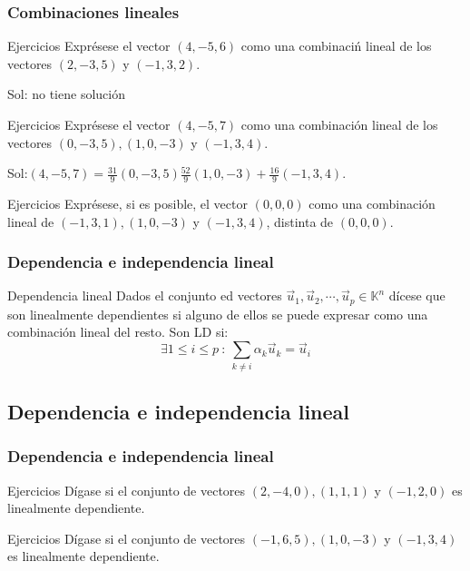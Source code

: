 \documentclass{beamer}
\begin{document}
\begin{frame}
  \frametitle{Combinaciones lineales}
  \begin{block}{Ejercicios}
Expr\'esese el vector $(4,-5,6)$ como una combinaci\'n lineal de los vectores $(2,-3,5)$ y $(-1,3,2)$.
\end{block}
Sol: no tiene soluci\'on
\begin{block}{Ejercicios}
Expr\'esese el vector $(4,-5,7)$ como una combinaci\'on lineal de los vectores $(0,-3,5),(1,0,-3)$ y $(-1,3,4)$.
\end{block}
Sol:$(4,-5,7) = \frac{31}{9}(0,-3,5)\frac{52}{9}(1,0,-3)+\frac{16}{9}(-1,3,4)$.
\begin{block}{Ejercicios}
Expr\'esese, si es posible, el vector $(0,0,0)$ como una combinaci\'on lineal de $(-1,3,1), (1,0,-3)$ y $(-1,3,4)$, distinta de $(0,0,0)$.
\end{block}
\end{frame}


\begin{frame}
  \frametitle{Dependencia e independencia lineal}
  \begin{block}{Dependencia lineal}
Dados el conjunto ed vectores $\vec u_1,\vec u_2,\cdots,\vec u_p\in\mathbb K^n$ d\'icese que son linealmente dependientes si alguno de ellos se puede expresar como una combinaci\'on lineal del resto. Son LD si:
\[\exists 1\leq i\leq p\ : \ \sum_{k\neq i} \alpha_k \vec u_k = \vec u_i\]
\end{block}
\end{frame}


\subsection{Dependencia e independencia lineal}
\begin{frame}
  \frametitle{Dependencia e independencia lineal}
  \begin{block}{Ejercicios}
D\'igase si el conjunto de vectores $(2,-4,0), (1,1,1)$ y $(-1,2,0)$ es linealmente dependiente.
\end{block}

\begin{block}{Ejercicios}
D\'igase si el conjunto de vectores $(-1,6,5), (1,0,-3)$ y $(-1,3,4)$ es linealmente dependiente.
\end{block}
\end{frame}
\end{document}
